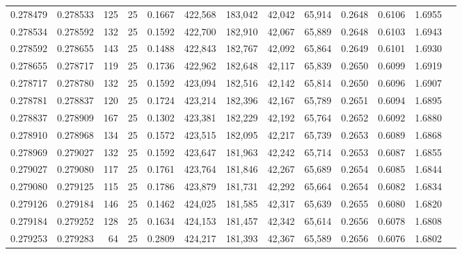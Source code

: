 \begin{tabular}{rrrrrrrrrrrrr}
0.278479 & 0.278533 &   125 &  25 &                                     0.1667 & 422,568 & 183,042 &  42,042 &  65,914 & 0.2648 & 0.6106 & 1.6955 \\
0.278534 & 0.278592 &   132 &  25 &                                     0.1592 & 422,700 & 182,910 &  42,067 &  65,889 & 0.2648 & 0.6103 & 1.6943 \\
0.278592 & 0.278655 &   143 &  25 &                                     0.1488 & 422,843 & 182,767 &  42,092 &  65,864 & 0.2649 & 0.6101 & 1.6930 \\
0.278655 & 0.278717 &   119 &  25 &                                     0.1736 & 422,962 & 182,648 &  42,117 &  65,839 & 0.2650 & 0.6099 & 1.6919 \\
0.278717 & 0.278780 &   132 &  25 &                                     0.1592 & 423,094 & 182,516 &  42,142 &  65,814 & 0.2650 & 0.6096 & 1.6907 \\
0.278781 & 0.278837 &   120 &  25 &                                     0.1724 & 423,214 & 182,396 &  42,167 &  65,789 & 0.2651 & 0.6094 & 1.6895 \\
0.278837 & 0.278909 &   167 &  25 &                                     0.1302 & 423,381 & 182,229 &  42,192 &  65,764 & 0.2652 & 0.6092 & 1.6880 \\
0.278910 & 0.278968 &   134 &  25 &                                     0.1572 & 423,515 & 182,095 &  42,217 &  65,739 & 0.2653 & 0.6089 & 1.6868 \\
0.278969 & 0.279027 &   132 &  25 &                                     0.1592 & 423,647 & 181,963 &  42,242 &  65,714 & 0.2653 & 0.6087 & 1.6855 \\
0.279027 & 0.279080 &   117 &  25 &                                     0.1761 & 423,764 & 181,846 &  42,267 &  65,689 & 0.2654 & 0.6085 & 1.6844 \\
0.279080 & 0.279125 &   115 &  25 &                                     0.1786 & 423,879 & 181,731 &  42,292 &  65,664 & 0.2654 & 0.6082 & 1.6834 \\
0.279126 & 0.279184 &   146 &  25 &                                     0.1462 & 424,025 & 181,585 &  42,317 &  65,639 & 0.2655 & 0.6080 & 1.6820 \\
0.279184 & 0.279252 &   128 &  25 &                                     0.1634 & 424,153 & 181,457 &  42,342 &  65,614 & 0.2656 & 0.6078 & 1.6808 \\
0.279253 & 0.279283 &    64 &  25 &                                     0.2809 & 424,217 & 181,393 &  42,367 &  65,589 & 0.2656 & 0.6076 & 1.6802 \\

\end{tabular}
